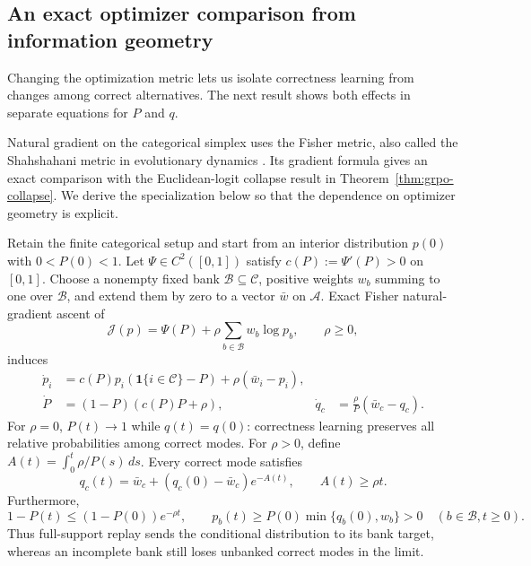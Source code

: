 \subsection{An exact optimizer comparison from information geometry}
\label{app:theory-natural-gradient}

Changing the optimization metric lets us isolate correctness learning from
changes among correct alternatives. The next result shows both effects in
separate equations for $P$ and $q$.


Natural gradient on the categorical simplex uses the Fisher metric, also
called the Shahshahani metric in evolutionary dynamics
\citep[Sections~2.3 and~3.1]{harper2009informationgeometry}. Its gradient
formula gives an exact comparison with the Euclidean-logit collapse result
in Theorem~\ref{thm:grpo-collapse}. We derive the specialization below so
that the dependence on optimizer geometry is explicit.

\begin{theorem}
\label{ext:thm-natural-replay}
Retain the finite categorical setup and start from an interior distribution
$p(0)$ with $0<P(0)<1$. Let $\Psi\in C^2([0,1])$ satisfy
$c(P):=\Psi'(P)>0$ on $[0,1]$. Choose a nonempty fixed bank
$\mathcal B\subseteq\mathcal C$, positive weights $w_b$ summing to one over
$\mathcal B$, and extend them by zero to a vector $\bar w$ on
$\mathcal A$. Exact Fisher natural-gradient ascent of
\[
 \mathcal J(p)=\Psi(P)+\rho\sum_{b\in\mathcal B}w_b\log p_b,
 \qquad \rho\ge0,
\]
induces
\begin{align}
 \dot p_i&=c(P)p_i(\mathbf 1\{i\in\mathcal C\}-P)
                     +\rho(\bar w_i-p_i),
 \label{ext:eq-natural-p}\\
 \dot P&=(1-P)(c(P)P+\rho),
 &\dot q_c&=\frac{\rho}{P}(\bar w_c-q_c).
 \label{ext:eq-natural-Pq}
\end{align}
For $\rho=0$, $P(t)\to1$ while $q(t)=q(0)$: correctness learning preserves
all relative probabilities among correct modes. For $\rho>0$, define
$A(t)=\int_0^t\rho/P(s)\,ds$. Every correct mode satisfies
\begin{equation}
 q_c(t)=\bar w_c+(q_c(0)-\bar w_c)e^{-A(t)},
 \qquad A(t)\ge\rho t.
 \label{ext:eq-natural-conditional-solution}
\end{equation}
Furthermore,
\begin{equation}
 1-P(t)\le(1-P(0))e^{-\rho t},
 \qquad
 p_b(t)\ge P(0)\min\{q_b(0),w_b\}>0
 \quad (b\in\mathcal B,t\ge0).
 \label{ext:eq-natural-retention}
\end{equation}
Thus full-support replay sends the conditional distribution to its bank
target, whereas an incomplete bank still loses unbanked correct modes in the
limit.
\end{theorem}

